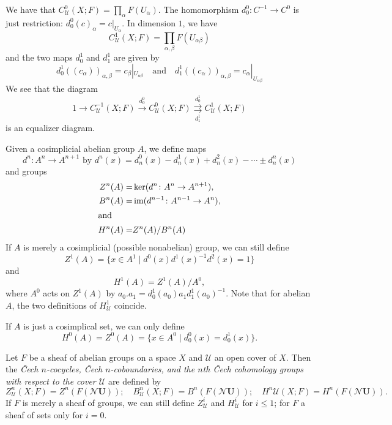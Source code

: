 \documentclass[a4paper,openany]{scrbook}
\newcommand{\nerve}{\mathcal N}
\begin{document}
\begin{example}
We have that $C^{0}_{\mathcal U}(X;F) = \prod_{\alpha} F(U_\alpha)$. The homomorphism $d^0_0\colon C^{-1} \to C^0$ is just restriction: $d^0_0(c)_{\alpha} = c|_{U_\alpha}$. In dimension $1$, we have
\[
C^1_{\mathcal U}(X;F) = \prod_{\alpha,\beta} F(U_{\alpha\beta})
\]
and the two maps $d^1_0$ and $d^1_1$ are given by
\[
d^1_0((c_\alpha))_{\alpha,\beta} = c_\beta|_{U_{\alpha\beta}} \quad \text{and} \quad d^1_1((c_\alpha))_{\alpha,\beta} = c_\alpha|_{U_{\alpha\beta}}
\]
We see that the diagram
\[
1 \to C^{-1}_{\mathcal U}(X;F) \xrightarrow{d^0_0} C^{0}_{\mathcal U}(X;F) \overset{d^1_0}{\underset{d^1_1}{\rightrightarrows}} C^1_{\mathcal U}(X;F)
\]
is an equalizer diagram.
\end{example}

\begin{defn}
Given a cosimplicial abelian group $A$, we define maps
\[
d^n\colon A^{n} \to A^{n+1} \text{ by } d^n(x) = d^0_n(x)-d^1_n(x)+d^2_n(x)-\cdots\pm d^n_n(x)
\]
and groups
\begin{align*}
Z^n(A) =& \ker(d^n\colon A^n \to A^{n+1}),\\
B^n(A) =& \operatorname{im}(d^{n-1}\colon A^{n-1} \to A^{n}),\\
\intertext{and}
H^n(A) =& Z^n(A)/B^n(A)
\end{align*}
If $A$ is merely a cosimplicial (possible nonabelian) group, we can still define
\[
Z^1(A) = \{x \in A^1 \mid d^0(x)d^1(x)^{-1}d^2(x)=1\}
\]
and
\[
H^1(A) = Z^1(A)/A^0,
\]
where $A^0$ acts on $Z^1(A)$ by $a_0.a_1 = d^1_0(a_0) a_1 d^1_1(a_0)^{-1}$. Note that for abelian $A$, the two definitions of $H^1_{\mathcal U}$ coincide.

If $A$ is just a cosimplical set, we can only define
\[
H^0(A) = Z^0(A) = \{x \in A^0 \mid d^0_0(x) = d^1_0(x)\}.
\]
\end{defn}

\begin{defn}
Let $F$ be a sheaf of abelian groups on a space $X$ and $\mathcal U$ an open cover of $X$. Then the \emph{Čech $n$-cocycles, Čech $n$-coboundaries, and the $n$th Čech cohomology groups with respect to the cover $\mathcal U$} are defined by
\[
Z^n_{\mathcal U}(X;F) = Z^n(F(\nerve \mathbf U)); \quad B^n_{\mathcal U}(X;F) = B^n(F(\nerve \mathbf U)); \quad H^n {\mathcal U}(X;F) = H^n(F(\nerve \mathbf U)).
\]
If $F$ is merely a sheaf of groups, we can still define $Z^i_{\mathcal U}$ and $H^i_{\mathcal U}$ for $i \leq 1$; for $F$ a sheaf of sets only for $i=0$.
\end{defn}
\end{document}
